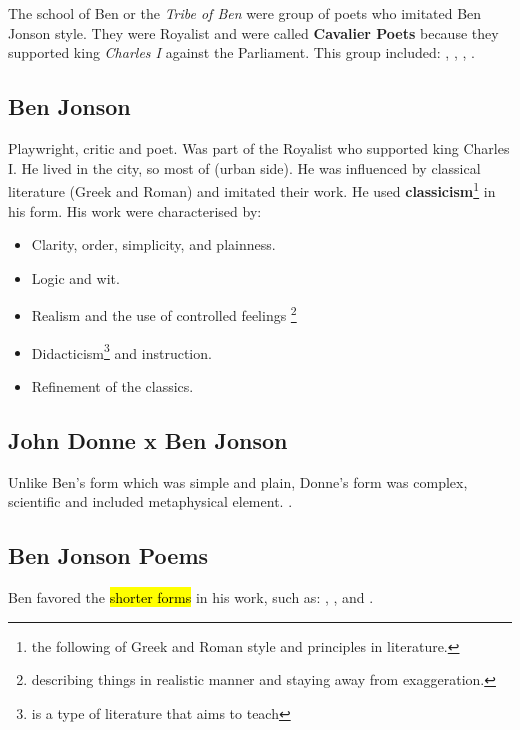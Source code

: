 \documentclass[12pt, a4paper]{article}
\begin{document}
{\section*{}

The school of Ben or the \textit{Tribe of Ben} were group of poets who imitated
Ben Jonson style. They were Royalist and were called \textbf{Cavalier Poets} because they
supported king \textit{Charles I} against the Parliament. This group included: 
, , 
, .

\subsection*{Ben Jonson}

Playwright, critic and poet. Was part of the Royalist who supported 
king Charles I. He lived in the city, 
so most of  (urban side). He was influenced by classical 
literature (Greek and Roman) and imitated their work. He used
\textbf{classicism}\footnote{the following of Greek and Roman style and 
principles in literature.} 
in his form. His work were characterised by:

\begin{itemize}
  \item Clarity, order, simplicity, and plainness.
  \item Logic and wit.
  \item Realism and the use of controlled feelings
    \footnote{describing things in realistic  manner and staying away 
    from exaggeration.}
  \item Didacticism\footnote{is a type of literature that aims to teach}
    and instruction.
  \item Refinement of the classics. 
\end{itemize}

\subsection*{John Donne x Ben Jonson}

Unlike Ben's form which was simple and plain, Donne's form was complex, 
scientific and included metaphysical element. .

\subsection*{Ben Jonson Poems} 
Ben favored the \hl{shorter forms} in his work, such as: 
, ,  and 
.\medbreak


}
\end{document}
